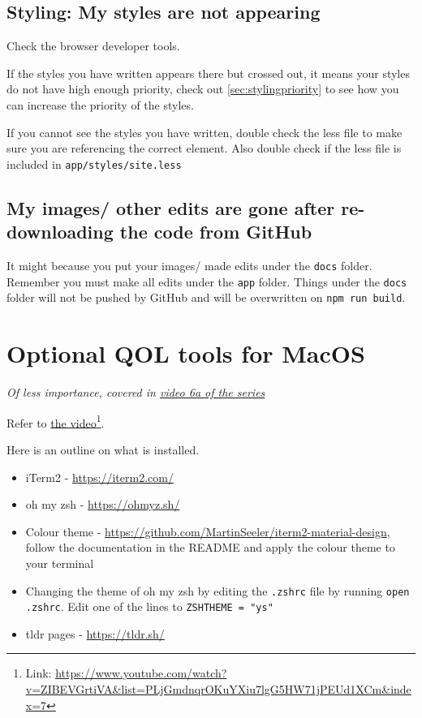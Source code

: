 \subsection{Styling: My styles are not appearing}

Check the browser developer tools.

If the styles you have written appears there but crossed out, it means your styles do not have high enough priority, check out \cref{sec:stylingpriority} to see how you can increase the priority of the styles.

If you cannot see the styles you have written, double check the less file to make sure you are referencing the correct element. Also double check if the less file is included in \texttt{app/styles/site.less}

\subsection{My images/ other edits are gone after re-downloading the code from GitHub}

It might because you put your images/ made edits under the \texttt{docs} folder. Remember you must make all edits under the \texttt{app} folder. Things under the \texttt{docs} folder will not be pushed by GitHub and will be overwritten on \texttt{npm run build}.

\section{Optional QOL tools for MacOS}
\label{sec:iterm}
\textit{Of less importance, covered in \href{https://www.youtube.com/watch?v=ZIBEVGrtiVA&list=PLjGmdnqrOKuYXiu7lgG5HW71jPEUd1XCm&index=7}{video 6a of the series}}
\vspace{6mm}

Refer to \href{https://www.youtube.com/watch?v=ZIBEVGrtiVA&list=PLjGmdnqrOKuYXiu7lgG5HW71jPEUd1XCm&index=7}{the video}\footnote{Link: \url{https://www.youtube.com/watch?v=ZIBEVGrtiVA&list=PLjGmdnqrOKuYXiu7lgG5HW71jPEUd1XCm&index=7}}.

Here is an outline on what is installed.
\begin{itemize}
    \item iTerm2 - \url{https://iterm2.com/}
    \item oh my zsh - \url{https://ohmyz.sh/}
    \item Colour theme - \url{https://github.com/MartinSeeler/iterm2-material-design}, follow the documentation in the README and apply the colour theme to your terminal
    \item Changing the theme of oh my zsh by editing the \texttt{.zshrc} file by running \texttt{open .zshrc}. Edit one of the lines to \texttt{ZSH\textunderscore THEME = "ys"} 
    \item tldr pages - \url{https://tldr.sh/}

\end{itemize}

